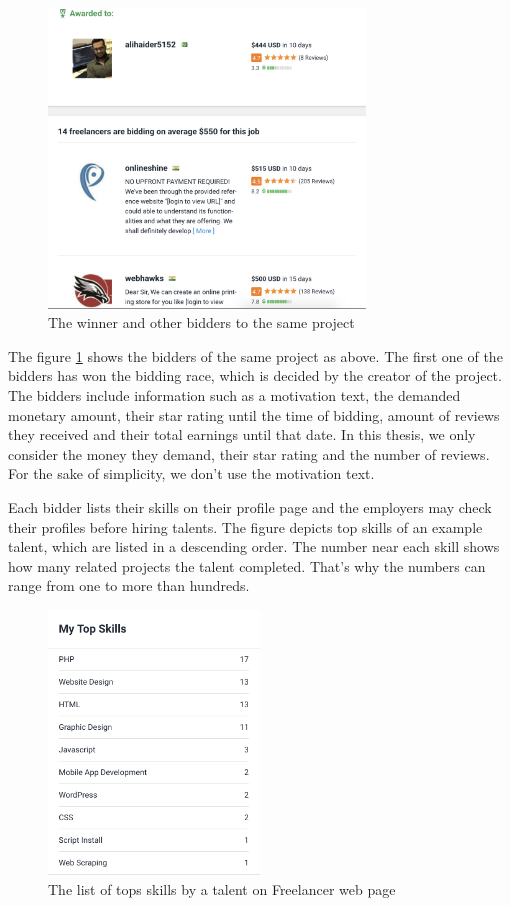 \begin{figure}[!ht]
	\centering
	\includegraphics[width=0.75\textwidth]{figures/FreelancerTalentExample.png}
	\caption{The winner and other bidders to the same project}
	\label{fig:freelancer-example-talent}
\end{figure}


The figure \ref{fig:freelancer-example-talent} shows the bidders of the same project as above. The first one of the bidders has won the bidding race, which is decided by the creator of the project. The bidders include information such as a motivation text, the demanded monetary amount, their star rating until the time of bidding, amount of reviews they received and their total earnings until that date. In this thesis, we only consider the money they demand, their star rating and the number of reviews. For the sake of simplicity, we don't use the motivation text.


Each bidder lists their skills on their profile page and the employers may check their profiles before hiring talents. The figure depicts top skills of an example talent, which are listed in a descending order. The number near each skill shows how many related projects the talent completed. That's why the numbers can range from one to more than hundreds. 


\begin{figure}[!ht]
	\centering
	\includegraphics[width=0.5\textwidth]{figures/FreelancerTalentSkills.png}
	\caption{The list of tops skills by a talent on Freelancer web page}
	\label{fig:freelancer-talent-talent}
\end{figure}


